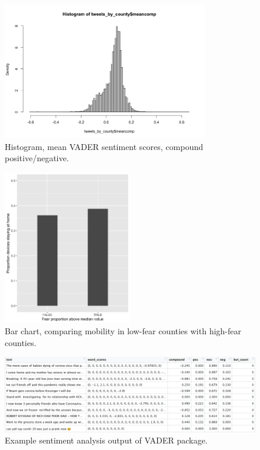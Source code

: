 \documentclass{article}
\begin{document}
\begin{figure}[h!]
  \includegraphics[width=0.8\textwidth]{figs/meancomp_hist.png}    
  \centering
  \caption{Histogram, mean VADER sentiment scores, compound positive/negative.}
  \label{meancomp_hist}
\end{figure}


\begin{figure}[!htb]
  \includegraphics[width=0.5\textwidth]{figs/setsplit.png}    
  \centering
  \caption{Bar chart, comparing mobility in low-fear counties with high-fear counties.}
  \label{setsplit}
\end{figure}


\begin{landscape}
  \vspace{1.5in}
  \begin{figure}[h!]
    \includegraphics[width=\textwidth]{figs/vader-table.png}    
    \centering
    \caption{Example sentiment analysis output of VADER package.}
  \end{figure}
  \end{landscape}
\end{document}
